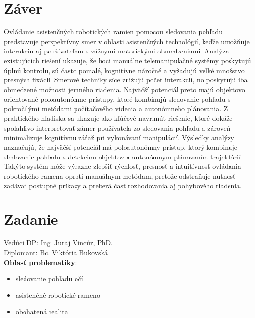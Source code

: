 \documentclass[11pt,english,a4paper]{article}
\begin{document}
\section{Záver}  \label{sec:conclusion}  
Ovládanie  asistenčných  robotických  ramien  pomocou  sledovania  pohľadu  predstavuje  perspektívny  smer  v  oblasti  asistenčných  technológií,  keďže  umožňuje  interakciu  aj  používateľom  s  vážnymi  motorickými  obmedzeniami.  Analýza  existujúcich  riešení  ukazuje,  že  hoci  manuálne  telemanipulačné  systémy  poskytujú  úplnú  kontrolu,  sú  často  pomalé,  kognitívne  náročné  a  vyžadujú  veľké  množstvo  presných  fixácií.  Smerové  techniky  síce  znižujú  počet  interakcií,  no  poskytujú  iba  obmedzené  možnosti  jemného  riadenia.  Najväčší  potenciál  preto  majú  objektovo  orientované  poloautonómne  prístupy,  ktoré  kombinujú  sledovanie  pohľadu  s  pokročilými  metódami  počítačového  videnia  a  autonómneho  plánovania.
Z  praktického  hľadiska  sa  ukazuje  ako  kľúčové  navrhnúť  riešenie,  ktoré  dokáže  spoľahlivo  interpretovať  zámer  používateľa  zo  sledovania  pohľadu  a  zároveň  minimalizuje  kognitívnu  záťaž  pri  vykonávaní  manipulácií.  Výsledky  analýzy  naznačujú,  že  najväčší  potenciál  má  poloautonómny  prístup,  ktorý  kombinuje  sledovanie  pohľadu  s  detekciou  objektov  a  autonómnym  plánovaním  trajektórií.  Takýto  systém  môže  výrazne  zlepšiť  rýchlosť,  presnosť  a  intuitívnosť  ovládania  robotického  ramena  oproti  manuálnym  metódam,  pretože  odstraňuje  nutnosť  zadávať  postupné  príkazy  a  preberá  časť  rozhodovania  aj  pohybového  riadenia.  

\printbibliography
\newpage
\appendix
\section{Zadanie}  \label{sec:zadanie}

Vedúci  DP:	Ing.  Juraj  Vincúr,  PhD.    \\
Diplomant:	Bc.  Viktória  Bukovská                          \\

\textbf{Oblasť  problematiky:}    
\begin{itemize}
        \item  sledovanie  pohľadu  očí
        \item  asistenčné  robotické  rameno
        \item  obohatená  realita
\end{itemize}
\end{document}
